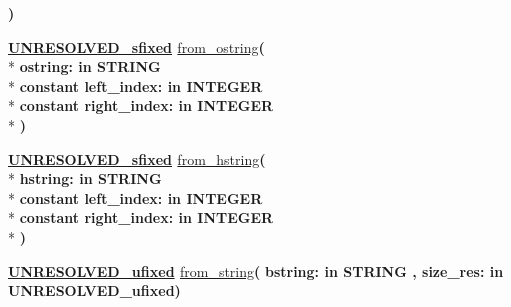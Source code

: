 \begin{DoxyCompactItemize}
{\bfseries  )} 
\item 
{\bfseries {\bfseries {\bfseries \hyperlink{classfixed__pkg_aa723b28a027c3c0f9bca02d75e8df4d6}{U\+N\+R\+E\+S\+O\+L\+V\+E\+D\+\_\+sfixed}} \textcolor{vhdlchar}{ }}} \hyperlink{classfixed__pkg_a13b6ef359fc5a25e37e6867e6b36629c}{from\+\_\+ostring}{\bfseries  ( }\\*
{\bfseries \textcolor{vhdlchar}{ostring\+: }\textcolor{stringliteral}{in }{\bfseries \textcolor{comment}{S\+T\+R\+I\+N\+G}\textcolor{vhdlchar}{ }}}\\*
{\bfseries {\bfseries \textcolor{keywordflow}{constant}\textcolor{vhdlchar}{ }}\textcolor{vhdlchar}{left\+\_\+index\+: }\textcolor{stringliteral}{in }{\bfseries \textcolor{comment}{I\+N\+T\+E\+G\+E\+R}\textcolor{vhdlchar}{ }}}\\*
{\bfseries {\bfseries \textcolor{keywordflow}{constant}\textcolor{vhdlchar}{ }}\textcolor{vhdlchar}{right\+\_\+index\+: }\textcolor{stringliteral}{in }{\bfseries \textcolor{comment}{I\+N\+T\+E\+G\+E\+R}\textcolor{vhdlchar}{ }}}\\*
{\bfseries  )} 
\item 
{\bfseries {\bfseries {\bfseries \hyperlink{classfixed__pkg_aa723b28a027c3c0f9bca02d75e8df4d6}{U\+N\+R\+E\+S\+O\+L\+V\+E\+D\+\_\+sfixed}} \textcolor{vhdlchar}{ }}} \hyperlink{classfixed__pkg_a10a9883c71bef33c1cdb7889520f1c36}{from\+\_\+hstring}{\bfseries  ( }\\*
{\bfseries \textcolor{vhdlchar}{hstring\+: }\textcolor{stringliteral}{in }{\bfseries \textcolor{comment}{S\+T\+R\+I\+N\+G}\textcolor{vhdlchar}{ }}}\\*
{\bfseries {\bfseries \textcolor{keywordflow}{constant}\textcolor{vhdlchar}{ }}\textcolor{vhdlchar}{left\+\_\+index\+: }\textcolor{stringliteral}{in }{\bfseries \textcolor{comment}{I\+N\+T\+E\+G\+E\+R}\textcolor{vhdlchar}{ }}}\\*
{\bfseries {\bfseries \textcolor{keywordflow}{constant}\textcolor{vhdlchar}{ }}\textcolor{vhdlchar}{right\+\_\+index\+: }\textcolor{stringliteral}{in }{\bfseries \textcolor{comment}{I\+N\+T\+E\+G\+E\+R}\textcolor{vhdlchar}{ }}}\\*
{\bfseries  )} 
\item 
{\bfseries {\bfseries {\bfseries \hyperlink{classfixed__pkg_ae78bc2b36d22f6abeac163955e8a587d}{U\+N\+R\+E\+S\+O\+L\+V\+E\+D\+\_\+ufixed}} \textcolor{vhdlchar}{ }}} \hyperlink{classfixed__pkg_ab76fd9edde5c322c159dc314164e65e5}{from\+\_\+string}{\bfseries  ( }{\bfseries \textcolor{vhdlchar}{bstring\+: }\textcolor{stringliteral}{in }{\bfseries \textcolor{comment}{S\+T\+R\+I\+N\+G}\textcolor{vhdlchar}{ }}}{\bfseries  , \textcolor{vhdlchar}{size\+\_\+res\+: }\textcolor{stringliteral}{in }\textcolor{vhdlchar}{U\+N\+R\+E\+S\+O\+L\+V\+E\+D\+\_\+ufixed}}{\bfseries  )} 

\end{DoxyCompactItemize}
